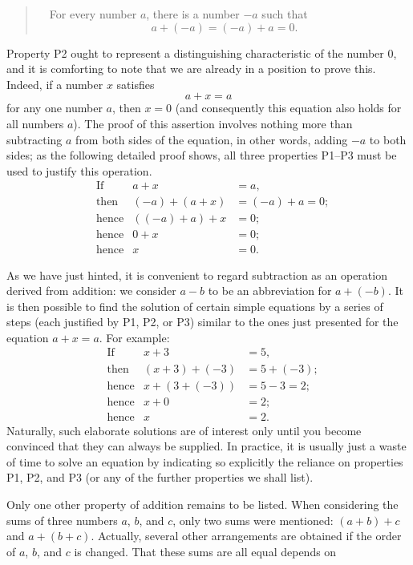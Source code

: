 \begin{quote}
\ \ For every number $a$, there is a number $-a$ such that
\[ a + (-a) = (-a) + a = 0. \]
\end{quote}

Property P2 ought to represent a distinguishing characteristic of the number
$0$, and it is comforting to note that we are already in a position to prove
this. Indeed, if a number $x$ satisfies
\[ a + x = a \]
for any one number $a$, then $x=0$ (and consequently this equation also holds
for all numbers $a$). The proof of this assertion involves nothing more than
subtracting $a$ from both sides of the equation, in other words, adding $-a$
to both sides; as the following detailed proof shows, all three properties
P1--P3 must be used to justify this operation.
\begin{align*}
&\text{If} & a + x &= a,\\
&\text{then} & (-a) + (a+x) &= (-a) + a = 0;\\
&\text{hence} & ((-a)+a)+x &= 0;\\
&\text{hence} & 0 + x &= 0;\\
&\text{hence} & x &= 0.
\end{align*}

As we have just hinted, it is convenient to regard subtraction as an
operation derived from addition: we consider $a-b$ to be an abbreviation for
$a+(-b)$. It is then possible to find the solution of certain simple
equations by a series of steps (each justified by P1, P2, or P3) similar to
the ones just presented for the equation $a+x=a$. For example:
\begin{align*}
&\text{If} & x + 3 &= 5,\\
&\text{then} & (x+3)+(-3) &= 5 + (-3);\\
&\text{hence} & x + (3+(-3)) &= 5 - 3 = 2;\\
&\text{hence} & x + 0 &= 2;\\
&\text{hence} & x &= 2.
\end{align*}
Naturally, such elaborate solutions are of interest only until you become
convinced that they can always be supplied. In practice, it is usually just a
waste of time to solve an equation by indicating so explicitly the reliance
on properties P1, P2, and P3 (or any of the further properties we shall
list).

Only one other property of addition remains to be listed. When considering
the sums of three numbers $a$, $b$, and $c$, only two sums were mentioned:
$(a+b)+c$ and $a+(b+c)$. Actually, several other arrangements are obtained if
the order of $a$, $b$, and $c$ is changed. That these sums are all equal
depends on

